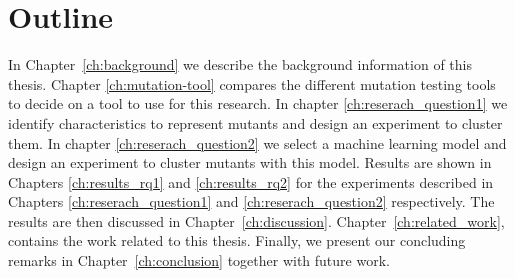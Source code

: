 \documentclass[../main]{subfiles}
\begin{document}
\section{Outline}
In Chapter~\ref{ch:background} we describe the background information of this thesis. 
Chapter \ref{ch:mutation-tool} compares the different mutation testing tools to decide on a tool to use for this research.
In chapter \ref{ch:reserach_question1} we identify characteristics to represent mutants and design an experiment to cluster them.
In chapter \ref{ch:reserach_question2} we select a machine learning model and design an experiment to cluster mutants with this model.
Results are shown in Chapters \ref{ch:results_rq1} and \ref{ch:results_rq2} for the experiments described in Chapters \ref{ch:reserach_question1} and \ref{ch:reserach_question2} respectively. 
The results are then discussed in Chapter~\ref{ch:discussion}.
\newline
Chapter~\ref{ch:related_work}, contains the work related to this thesis.
Finally, we present our concluding remarks in Chapter~\ref{ch:conclusion} together with future work.
\end{document}
